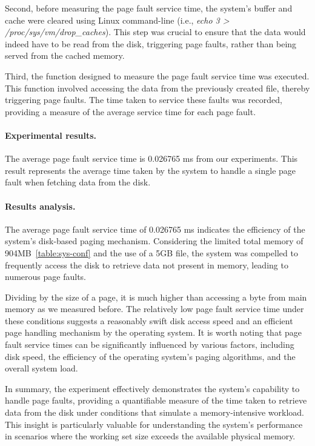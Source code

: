 Second, before measuring the page fault service time, the system's buffer and cache were cleared using Linux command-line (i.e., \emph{echo 3 > /proc/sys/vm/drop\_caches}). This step was crucial to ensure that the data would indeed have to be read from the disk, triggering page faults, rather than being served from the cached memory.

Third, the function designed to measure the page fault service time was executed. This function involved accessing the data from the previously created file, thereby triggering page faults. The time taken to service these faults was recorded, providing a measure of the average service time for each page fault.

\paragraph{Experimental results.}
The average page fault service time is 0.026765 ms from our experiments.
This result represents the average time taken by the system to handle a single page fault when fetching data from the disk.

\paragraph{Results analysis.}
The average page fault service time of 0.026765 ms indicates the efficiency of the system's disk-based paging mechanism. Considering the limited total memory of 904MB~\ref{table:sys-conf} and the use of a 5GB file, the system was compelled to frequently access the disk to retrieve data not present in memory, leading to numerous page faults.

Dividing by the size of a page, it is much higher than accessing a byte from main memory as we measured before.
The relatively low page fault service time under these conditions suggests a reasonably swift disk access speed and an efficient page handling mechanism by the operating system. It is worth noting that page fault service times can be significantly influenced by various factors, including disk speed, the efficiency of the operating system's paging algorithms, and the overall system load.

In summary, the experiment effectively demonstrates the system's capability to handle page faults, providing a quantifiable measure of the time taken to retrieve data from the disk under conditions that simulate a memory-intensive workload. This insight is particularly valuable for understanding the system's performance in scenarios where the working set size exceeds the available physical memory.